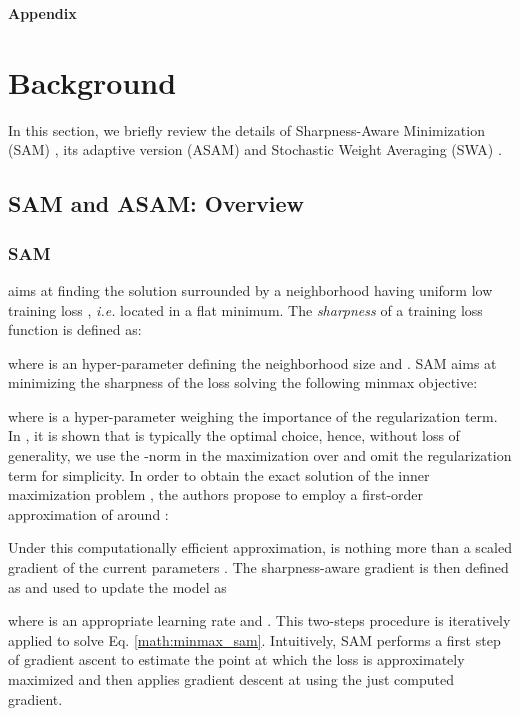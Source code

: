 {\noindent
\textbf{\Large{Appendix}}}

\section{Background}
\label{app:background}
In this section, we briefly review the details of Sharpness-Aware Minimization (SAM) \cite{foret2020sharpness}, its adaptive version (ASAM) \cite{kwon2021asam} and Stochastic Weight Averaging (SWA) \cite{izmailov2018averaging}.
\subsection{SAM and ASAM: Overview}
\subsubsection{SAM} aims at finding the solution  surrounded by a neighborhood having uniform low training loss , \textit{i.e.} located in a flat minimum. The \textit{sharpness} of a training loss function is defined as:

where  is an hyper-parameter defining the neighborhood size and . SAM aims at minimizing the sharpness of the loss solving the following minmax objective:

where  is a hyper-parameter weighing the importance of the regularization term. In \cite{foret2020sharpness}, it is shown that  is typically the optimal choice, hence, without loss of generality, we use the -norm in the maximization over  and omit the regularization term for simplicity. In order to obtain the exact solution of the inner maximization problem , the authors propose to employ a first-order approximation of  around :

Under this computationally efficient approximation, 
 is nothing more than a scaled gradient of the current parameters . The sharpness-aware gradient is then defined as  and used to update the model as 

where  is an appropriate learning rate and . This two-steps procedure is iteratively applied to solve Eq. \ref{math:minmax_sam}. Intuitively, SAM performs a first step of gradient ascent to estimate the point  at which the loss is approximately maximized and then applies gradient descent at  using the just computed gradient.

